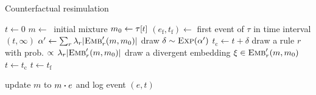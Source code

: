 \newcommand{\EVF}[0]{e_{\text{f}}}
\newcommand{\EVCF}[0]{e_{\text{c}}}

\renewcommand{\algorithmicrequire}{\textbf{Input:}}
\renewcommand{\algorithmicensure}{\textbf{Output:}}

\begin{algorithm}[h]
\caption{Counterfactual resimulation}\label{alg:cosimulation}
\begin{spacing}{1.3}
\begin{algorithmic}[1]
\vspace{0.2cm}
\STATE $t \gets 0$
\STATE $m \gets\ $ initial mixture
  \STATE $m_0 \gets \TSTATE{t}{\tau}$
  \STATE $(\EVF{}, t_{\text{f}}) \gets $ first event of $\tau$ in time interval $(t, \infty)$
  \vspace{0.1cm}
  \STATE $\alpha' \gets \sum_r {\lambda_r |{\textsc{Emb}}'_{r}(m, m_0)|}$
  \vspace{0.1cm}
  \STATE draw $\delta \sim \textsc{Exp}(\alpha') $
  \STATE $t_{\text{c}} \gets t + \delta$
   \label{cosim:cev}
      \STATE draw a rule $r$ with prob.
      $\propto \, \lambda_r |{\textsc{Emb}}'_{r}(m, m_0)|$
      \STATE  draw a divergent embedding $\xi \in {\textsc{Emb}}'_{r}(m, m_0)$
      \STATE $t \gets t_{\text{c}}$
  \ELSE
      \STATE {$e \gets \EVF{}$}
      \STATE $t \gets t_{\text{f}}$
  \ENDIF

      \STATE update $m$ to $\UPDATE{m}{e}$ and log event $(e, t)$
  \ENDIF
\ENDWHILE
\vspace{0.1cm}
\end{algorithmic}
\end{spacing}
\end{algorithm}